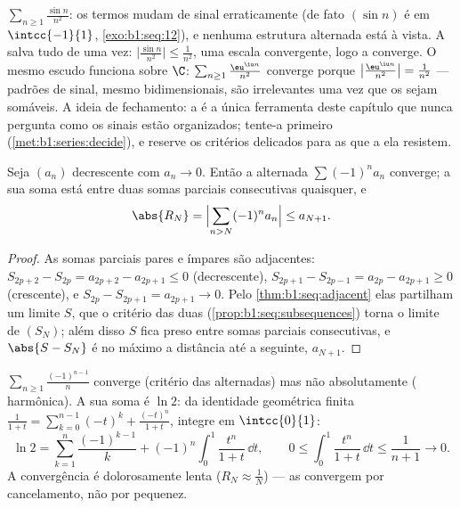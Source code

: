 \begin{example}\label{ex:b1:series:absexamples}
$\sum_{n\geq1} \frac{\sin n}{n^2}$: os termos mudam de sinal
erraticamente (de fato $(\sin n)$ é  em $\intcc{-1}{1}$,
\cref{exo:b1:seq:12}), e nenhuma estrutura alternada está à
vista. A  salva tudo de uma vez:
$\bigl|\frac{\sin n}{n^2}\bigr| \leq \frac{1}{n^2}$, uma
escala convergente, logo a  converge. O mesmo escudo funciona
sobre $\C$: $\sum_{n\geq1}\frac{\eu^{\iu n}}{n^2}$ converge
porque $\bigl|\frac{\eu^{\iu n}}{n^2}\bigr| = \frac{1}{n^2}$
--- padrões de sinal, mesmo bidimensionais, são irrelevantes
uma vez que os  sejam somáveis. A ideia de fechamento: a
 é a única ferramenta deste capítulo que nunca
pergunta como os sinais estão organizados; tente-a primeiro
(\cref{met:b1:series:decide}), e reserve os critérios delicados
para as  que a ela resistem.
\end{example}

\begin{theorem}\label{thm:b1:series:alternating}
Seja $(a_n)$ decrescente com $a_n \to 0$. Então a  alternada
$\sum (-1)^n a_n$ converge; a sua soma está entre duas somas parciais
consecutivas quaisquer, e
\[
\abs{R_N} = \Bigl| \sum_{n > N} (-1)^n a_n \Bigr| \leq a_{N+1} .
\]
\end{theorem}

\begin{proof}
As somas parciais pares e ímpares são adjacentes: $S_{2p+2} - S_{2p} =
a_{2p+2} - a_{2p+1} \leq 0$
(decrescente), $S_{2p+1} - S_{2p-1} =
a_{2p} - a_{2p+1} \geq 0$ (crescente), e $S_{2p} - S_{2p+1} =
a_{2p+1} \to 0$. Pelo \cref{thm:b1:seq:adjacent} elas partilham
um limite $S$, que o critério das duas 
(\cref{prop:b1:seq:subsequences}) torna o limite de $(S_N)$;
além disso $S$ fica preso entre somas parciais consecutivas, e
$\abs{S - S_N}$ é no máximo a distância até a seguinte, $a_{N+1}$.
\end{proof}

\begin{example}\label{ex:b1:series:ln2}
$\sum_{n \geq 1} \frac{(-1)^{n-1}}{n}$ converge (critério das alternadas)
mas não absolutamente ( harmônica). A sua soma é $\ln 2$: da
identidade geométrica finita $\frac{1}{1+t} = \sum_{k=0}^{n-1} (-t)^k +
\frac{(-t)^n}{1+t}$, integre em $\intcc{0}{1}$:
\[
\ln 2 = \sum_{k=1}^{n} \frac{(-1)^{k-1}}{k}
+ (-1)^n \int_0^1 \frac{t^n}{1+t}\,\dd t ,
\qquad
0 \leq \int_0^1 \frac{t^n}{1+t}\,\dd t \leq \frac{1}{n+1} \to 0 .
\]
A convergência é dolorosamente lenta ($R_N \approx \frac{1}{N}$) ---
as  convergem por cancelamento, não por pequenez.
\end{example}

